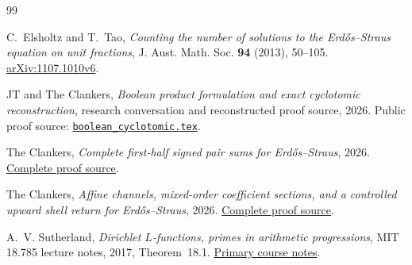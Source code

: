 \begin{thebibliography}{99}

C.~Elsholtz and T.~Tao,
\emph{Counting the number of solutions to the Erd\H{o}s--Straus equation on unit fractions},
J. Aust. Math. Soc. \textbf{94} (2013), 50--105.
\href{https://arxiv.org/abs/1107.1010}{arXiv:1107.1010v6}.

JT and The Clankers,
\emph{Boolean product formulation and exact cyclotomic reconstruction},
research conversation and reconstructed proof source, 2026.
Public proof source: \href{https://github.com/KokunoYumeto/erdos-straus-foundation/blob/a8cefe028e383d1967cc8876fbbdd9325db9bfb8/research/continuation-2026-09-12/reconstructed/boolean_cyclotomic.tex}{\texttt{boolean\_cyclotomic.tex}}.

The Clankers,
\emph{Complete first-half signed pair sums for Erd\H{o}s--Straus}, 2026.
\href{https://github.com/KokunoYumeto/erdos-straus-foundation/blob/a8cefe028e383d1967cc8876fbbdd9325db9bfb8/research/incoming/es-turn06-full-shell-20260919/core.tex}{Complete proof source}.

The Clankers,
\emph{Affine channels, mixed-order coefficient sections, and a controlled upward shell return for Erd\H{o}s--Straus}, 2026.
\href{https://github.com/KokunoYumeto/erdos-straus-foundation/blob/6125e74b1aadb860965964e2ae3587c902dbbab8/research/incoming/es-turn07-mixed-order-upward-20260923/core.tex}{Complete proof source}.

A.~V. Sutherland,
\emph{Dirichlet $L$-functions, primes in arithmetic progressions},
MIT 18.785 lecture notes, 2017, Theorem~18.1.
\href{https://math.mit.edu/classes/18.785/2017fa/LectureNotes18.pdf}{Primary course notes}.

\end{thebibliography}
